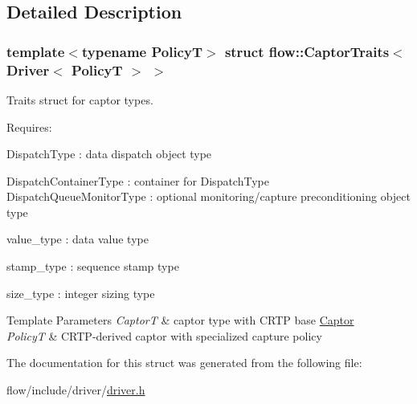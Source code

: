 \subsection{Detailed Description}
\subsubsection*{template$<$typename PolicyT$>$\newline
struct flow\+::\+Captor\+Traits$<$ Driver$<$ Policy\+T $>$ $>$}

Traits struct for captor types. 

Requires\+:
\begin{DoxyItemize}
\item {\ttfamily Dispatch\+Type} \+: data dispatch object type
\item {\ttfamily Dispatch\+Container\+Type} \+: container for {\ttfamily Dispatch\+Type} {\ttfamily Dispatch\+Queue\+Monitor\+Type} \+: optional monitoring/capture preconditioning object type
\item {\ttfamily value\+\_\+type} \+: data value type
\item {\ttfamily stamp\+\_\+type} \+: sequence stamp type
\item {\ttfamily size\+\_\+type} \+: integer sizing type
\end{DoxyItemize}


\begin{DoxyTemplParams}{Template Parameters}
{\em CaptorT} & captor type with C\+R\+TP base {\ttfamily \hyperlink{classflow_1_1_captor}{Captor}} \\
\hline
{\em PolicyT} & C\+R\+T\+P-\/derived captor with specialized capture policy \\
\hline
\end{DoxyTemplParams}


The documentation for this struct was generated from the following file\+:\begin{DoxyCompactItemize}
\item 
flow/include/driver/\hyperlink{driver_8h}{driver.\+h}\end{DoxyCompactItemize}

